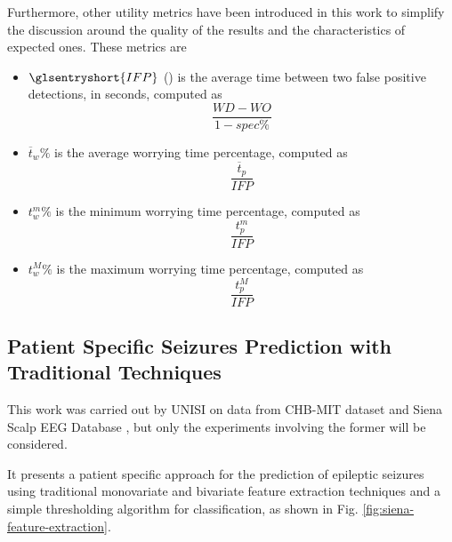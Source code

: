 Furthermore, other utility metrics have been introduced in this work to simplify the discussion around the quality of the results and the characteristics of expected ones. These metrics are

\begin{itemize}
    \item $\glsentryshort{IFP}$ () is the average time between two false positive detections, in seconds, computed as
        \begin{equation}
            \frac{WD - WO}{1 - spec\%}
        \end{equation}
    \item $\overline{t}_w\%$ is the average worrying time percentage, computed as
        \begin{equation}
            \frac{\overline{t}_p}{IFP}
        \end{equation}    
    \item $t_w^m\%$ is the minimum worrying time percentage, computed as
        \begin{equation}
            \frac{t_p^m}{IFP}
        \end{equation}
    \item $t_w^M\%$ is the maximum worrying time percentage, computed as
        \begin{equation}
            \frac{t_p^M}{IFP}
        \end{equation}
\end{itemize}


\subsection{Patient Specific Seizures Prediction with Traditional Techniques} \label{subsec:refwork-siena}
This work was carried out by \gls{UNISI} \cite{detti_patient-specific_2019, detti_paolo_siena_2020} on data from \gls{CHB-MIT} dataset and Siena Scalp \gls{EEG} Database \cite{detti_eeg_2020, detti_paolo_siena_2020}, but only the experiments involving the former will be considered.

It presents a patient specific approach for the prediction of epileptic seizures using traditional monovariate and bivariate feature extraction techniques and a simple thresholding algorithm for classification, as shown in Fig. \ref{fig:siena-feature-extraction}.

